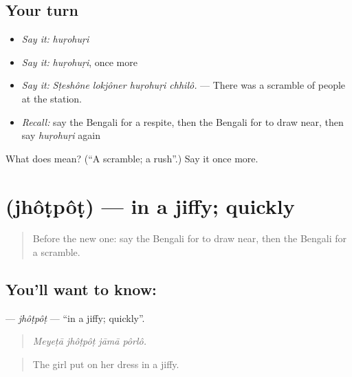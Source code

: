 \subsection*{Your turn}
\begin{itemize}
\raggedright
  \item \emph{Say it:} \emph{huṛohuṛi}
  \item \emph{Say it:} \emph{huṛohuṛi}, once more
  \item \emph{Say it:} \emph{Sṭeshône lokjôner huṛohuṛi chhilô.} — There was a scramble of people at the station.
  \item \emph{Recall:} say the Bengali for a respite, then the Bengali for to draw near, then say \emph{huṛohuṛi} again
\end{itemize}

\begin{tcolorbox}[breakable,colback=teal!4,colframe=teal!35!black,title={Before you move on}]
What does  mean? (\textquotedblleft{}A scramble; a rush\textquotedblright{}.) Say it once more.
\end{tcolorbox}
\section[\texorpdfstring{\bn{ঝটপট} (jhôṭpôṭ)}{ঝটপট (jhôṭpôṭ)}]{ (jhôṭpôṭ) — in a jiffy; quickly}

\label{lesson:BN-C544-jhotpot}



\begin{quote}
Before the new one: say the Bengali for to draw near, then the Bengali for a scramble.
\end{quote}

\subsection*{You'll want to know: }
\textbf{} — \emph{jhôṭpôṭ} — \textquotedblleft{}in a jiffy; quickly\textquotedblright{}.

\begin{quote}
   
\end{quote}

\begin{quote}
\emph{Meyeṭā jhôṭpôṭ jāmā pôrlô.}
\end{quote}

\begin{quote}
The girl put on her dress in a jiffy.
\end{quote}

